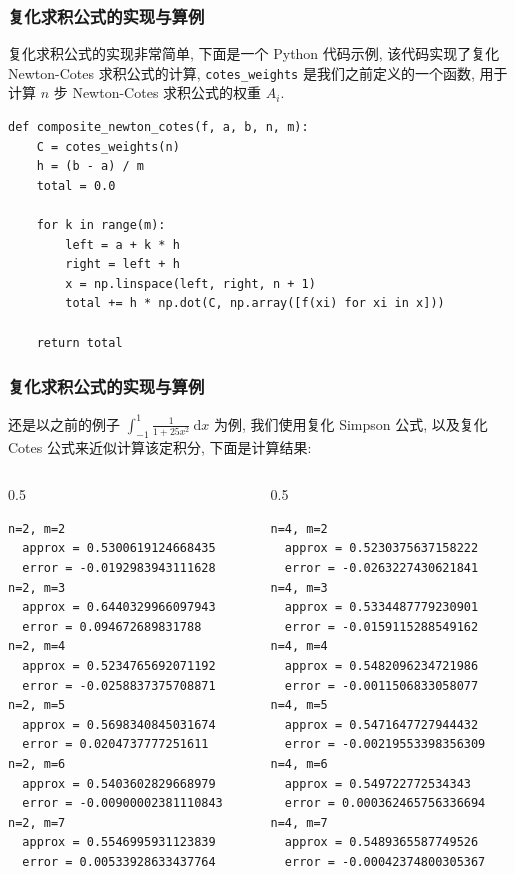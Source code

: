 
\begin{frame}[fragile]
\frametitle{复化求积公式的实现与算例}

复化求积公式的实现非常简单, 下面是一个 Python 代码示例, 该代码实现了复化 Newton-Cotes 求积公式的计算, \verb|cotes_weights| 是我们之前定义的一个函数, 用于计算 $n$ 步 Newton-Cotes 求积公式的权重 $A_i$.

\vspace{0.5em}

\begin{lstlisting}
def composite_newton_cotes(f, a, b, n, m):
    C = cotes_weights(n)
    h = (b - a) / m
    total = 0.0

    for k in range(m):
        left = a + k * h
        right = left + h
        x = np.linspace(left, right, n + 1)
        total += h * np.dot(C, np.array([f(xi) for xi in x]))

    return total
\end{lstlisting}

\end{frame}


\begin{frame}[fragile]
\frametitle{复化求积公式的实现与算例}

还是以之前的例子 $\int_{-1}^1 \frac{1}{1+ 25x^2} ~ \mathrm{d}x$ 为例, 我们使用复化 Simpson 公式, 以及复化 Cotes 公式来近似计算该定积分, 下面是计算结果:

\begin{columns}
\begin{column}{0.5\textwidth}
\begin{lstlisting}[numbers=none,keywordstyle=\color{black}]
n=2, m=2
  approx = 0.5300619124668435
  error = -0.0192983943111628
n=2, m=3
  approx = 0.6440329966097943
  error = 0.094672689831788
n=2, m=4
  approx = 0.5234765692071192
  error = -0.0258837375708871
n=2, m=5
  approx = 0.5698340845031674
  error = 0.0204737777251611
n=2, m=6
  approx = 0.5403602829668979
  error = -0.00900002381110843
n=2, m=7
  approx = 0.5546995931123839
  error = 0.00533928633437764
\end{lstlisting}
\end{column}
\begin{column}{0.5\textwidth}
\begin{lstlisting}[numbers=none,keywordstyle=\color{black}]
n=4, m=2
  approx = 0.5230375637158222
  error = -0.0263227430621841
n=4, m=3
  approx = 0.5334487779230901
  error = -0.0159115288549162
n=4, m=4
  approx = 0.5482096234721986
  error = -0.0011506833058077
n=4, m=5
  approx = 0.5471647727944432
  error = -0.00219553398356309
n=4, m=6
  approx = 0.549722772534343
  error = 0.000362465756336694
n=4, m=7
  approx = 0.5489365587749526
  error = -0.00042374800305367
\end{lstlisting}
\end{column}
\end{columns}

\end{frame}

